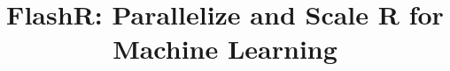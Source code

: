 \documentclass[sigplan,10pt,review,anonymous]{acmart}\settopmatter{printfolios=true,printccs=false,printacmref=false}
\begin{document}
\title{FlashR: Parallelize and Scale R for Machine Learning}




\end{document}
